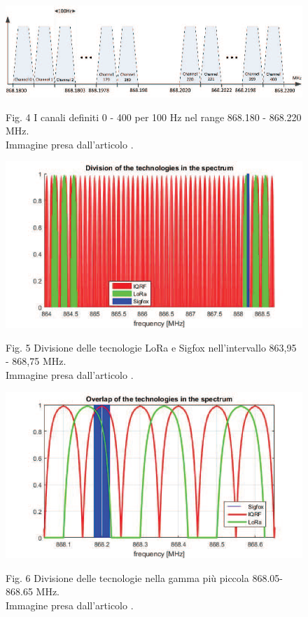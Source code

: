 \documentclass[a4paper]{report} %
\begin{document}
\begin{figure}
	\centering
	\includegraphics[scale=.5]{Immagini/DivisioneBande.png}
	
	Fig. 4 I canali definiti 0 - 400 per 100 Hz nel range 868.180 - 868.220 MHz.\\ %
	Immagine presa dall'articolo \cite{art:rif.46}.
\end{figure}

\begin{figure}
	\centering
	\includegraphics[scale=.5]{Immagini/DivB.png}
	
	Fig. 5 Divisione delle tecnologie LoRa e Sigfox nell'intervallo 863,95 - 868,75 MHz.\\ %
	Immagine presa dall'articolo \cite{art:rif.46}.
\end{figure}

\begin{figure}
	\centering
	\includegraphics[scale=.5]{Immagini/DivisioneBande2.png}
	
	Fig. 6 Divisione delle tecnologie nella gamma più piccola 868.05-868.65 MHz.\\ %
	Immagine presa dall'articolo \cite{art:rif.46}.
\end{figure}
\end{document}

